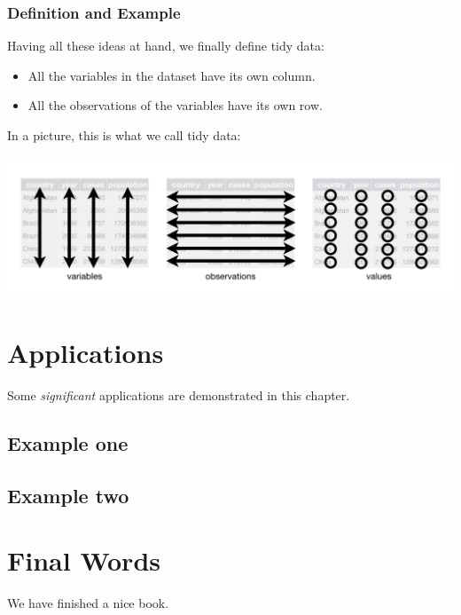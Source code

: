 \documentclass[]{book}
\begin{document}
\subsection{Definition and Example}\label{definition-and-example}

Having all these ideas at hand, we finally define tidy data:

\begin{itemize}
\item
  All the variables in the dataset have its own column.
\item
  All the observations of the variables have its own row.
\end{itemize}

In a picture, this is what we call tidy data:

\includegraphics{images/tidy-1.png}

\chapter{Applications}\label{applications}

Some \emph{significant} applications are demonstrated in this chapter.

\section{Example one}\label{example-one}

\section{Example two}\label{example-two}

\chapter{Final Words}\label{final-words}

We have finished a nice book.


\end{document}
